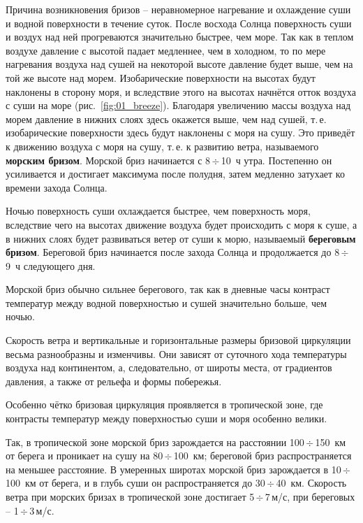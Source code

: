 \documentclass[a4paper, 12pt, twoside, final, book, russian, fittopage, cyremdash, openright]{ncc}
\newcommand{\mps}{\,м/с\xspace}
\newcommand{\otdo}{\,\ensuremath{\div}\,}
\begin{document}
Причина возникновения бризов \--- неравномерное нагревание и
охлаждение суши и водной поверхности в течение суток. После восхода
Солнца поверхность суши и воздух над ней прогреваются значительно
быстрее, чем море. Так как в теплом воздухе давление с высотой падает
медленнее, чем в холодном, то по мере нагревания воздуха над сушей на
некоторой высоте давление будет выше, чем на той же высоте над
морем. Изобарические поверхности на высотах будут наклонены в сторону
моря, и вследствие этого на высотах начнётся отток воздуха с суши на
море (рис.~\ref{fig:01_breeze}). Благодаря увеличению массы воздуха
над морем давление в нижних слоях здесь окажется выше, чем над сушей,
т.\,е. изобарические поверхности здесь будут наклонены с моря на
сушу. Это приведёт к движению воздуха с моря на сушу, т.\,е. к развитию
ветра, называемого \textbf{морским
  бризом}. Морской бриз начинается с 8\otdo{}10~ч
утра. Постепенно он усиливается и достигает максимума после полудня,
затем медленно затухает ко времени захода Солнца.

Ночью поверхность суши охлаждается быстрее, чем поверхность моря,
вследствие чего на высотах движение воздуха будет происходить с моря к
суше, а в нижних слоях будет развиваться ветер от суши к морю,
называемый \textbf{береговым бризом}. Береговой
бриз начинается после захода Солнца и продолжается до 8\otdo{}9~ч
следующего дня.

Морской бриз обычно сильнее берегового, так как в дневные часы
контраст температур между водной поверхностью и сушей значительно
больше, чем ночью.

Скорость ветра и вертикальные и горизонтальные размеры бризовой
циркуляции весьма разнообразны и изменчивы. Они зависят от суточного
хода температуры воздуха над континентом, а, следовательно, от широты
места, от градиентов давления, а также от рельефа и формы побережья.

Особенно чётко бризовая циркуляция проявляется в тропической зоне, где
контрасты температур между поверхностью суши и моря особенно велики.

Так, в тропической зоне морской бриз зарождается на расстоянии
100\otdo{}150~км от берега и проникает на сушу на 80\otdo{}100~км; береговой
бриз распространяется на меньшее расстояние. В умеренных широтах
морской бриз зарождается в 10\otdo{}100~км от берега, и в глубь суши он
распространяется до 30\otdo{}40~км. Скорость ветра при морских бризах в
тропической зоне достигает 5\otdo{}7\mps{}, при береговых \--- 1\otdo{}3\mps{}.
\end{document}
